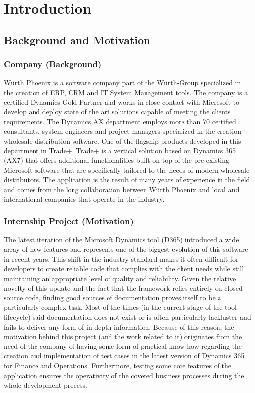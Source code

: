 \chapter{Introduction}

\section{Background and Motivation} 

\subsection{Company (Background)}
Würth Phoenix is a software company part of the Würth-Group specialized in the creation of ERP, CRM and IT System Management tools. The company is a certified Dynamics Gold Partner and works in close contact with Microsoft to develop and deploy state of the art solutions capable of meeting the clients requirements. The Dynamics AX department employs more than 70 certified consultants, system engineers and project managers specialized in the creation wholesale distribution software. One of the flagship products developed in this department in Trade+. Trade+ is a vertical solution based on Dynamics 365 (AX7) that offers additional functionalities built on top of the pre-existing Microsoft software that are specifically tailored to the needs of modern wholesale distributors. The application is the result of many years of experience in the field and comes from the long collaboration between Würth Phoenix and local and international companies that operate in the industry.

\subsection{Internship Project (Motivation)}
The latest iteration of the Microsoft Dynamics tool (D365) introduced a wide array of new features and represents one of the biggest evolution of this software in recent years. This shift in the industry standard makes it often difficult for developers to create reliable code that complies with the client needs while still maintaining an appropriate level of quality and reliability. Given the relative novelty of this update and the fact that the framework relies entirely on closed source code, finding good sources of documentation proves itself to be a particularly complex task. Most of the times (in the current stage of the tool lifecycle) said documentation does not exist or is often particularly lackluster and fails to deliver any form of in-depth information. Because of this reason, the motivation behind this project (and the work related to it) originates from the need of the company of having some form of practical know-how regarding the creation and implementation of test cases in the latest version of Dynamics 365 for Finance and Operations. Furthermore, testing some core features of the application ensures the operativity of the covered business processes during the whole development process.

